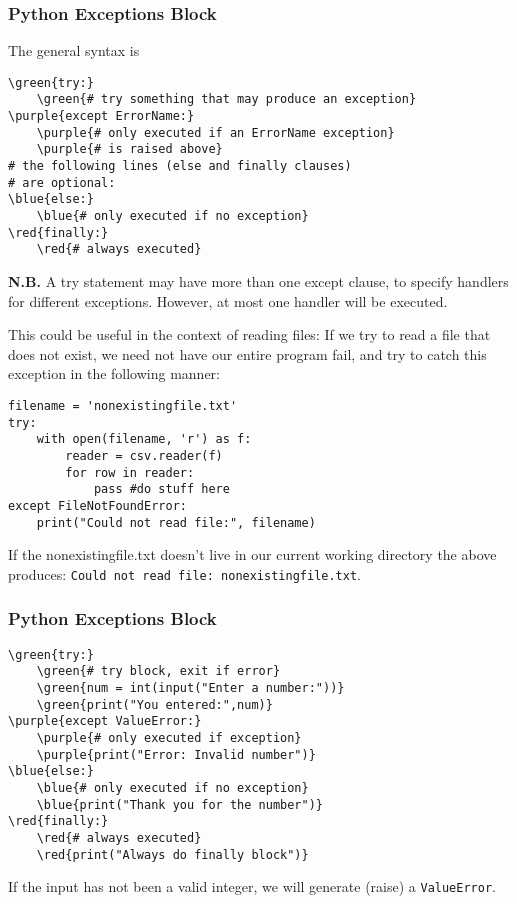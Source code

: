 \documentclass[xcolor=svgnames]{beamer}
\newcommand{\red}[1]{\textcolor{red}{#1}}
\newcommand{\green}[1]{\textcolor{ForestGreen}{#1}}
\newcommand{\blue}[1]{{\textcolor{blue}{#1}}}
\newcommand{\purple}[1]{{\textcolor{purple}{#1}}}
\newcommand{\ft}[1]{\frametitle{#1}}
\begin{document}
\begin{frame}[fragile]\ft{Python Exceptions Block}
The general syntax is 
\begin{Verbatim}[xleftmargin=0.1in, commandchars=\\\{\}, frame=single] 
\green{try:}
    \green{# try something that may produce an exception}
\purple{except ErrorName:}
    \purple{# only executed if an ErrorName exception}
    \purple{# is raised above}
# the following lines (else and finally clauses) 
# are optional:
\blue{else:}
    \blue{# only executed if no exception}
\red{finally:}
    \red{# always executed}
\end{Verbatim}
{\bf N.B.} A try statement may have more than one except clause, to specify handlers for different exceptions. However, at most one handler will be executed.
\end{frame}


\begin{frame}[fragile]
This could be useful in the context of reading files: If we try to read a file that does not exist, we need not have our entire program fail, and try to catch this exception in the following manner:
\begin{Verbatim}[frame=single, xleftmargin=0.5in]
filename = 'nonexistingfile.txt'
try:
    with open(filename, 'r') as f:
        reader = csv.reader(f)
        for row in reader:
            pass #do stuff here
except FileNotFoundError:
    print("Could not read file:", filename)
\end{Verbatim}
If the {\sf nonexistingfile.txt} doesn't live in our current working directory the above produces: \verb|Could not read file: nonexistingfile.txt|.
\end{frame}







\begin{frame}[fragile]\ft{Python Exceptions Block}

\begin{Verbatim}[xleftmargin=.5in, commandchars=\\\{\}] 
\green{try:}
    \green{# try block, exit if error}
    \green{num = int(input("Enter a number:"))}
    \green{print("You entered:",num)}
\purple{except ValueError:}
    \purple{# only executed if exception}
    \purple{print("Error: Invalid number")}
\blue{else:}
    \blue{# only executed if no exception}
    \blue{print("Thank you for the number")}
\red{finally:}
    \red{# always executed}
    \red{print("Always do finally block")}
\end{Verbatim}
If the input has not been a valid integer, we will generate (raise) a {\tt ValueError}.
\end{frame}
\end{document}
